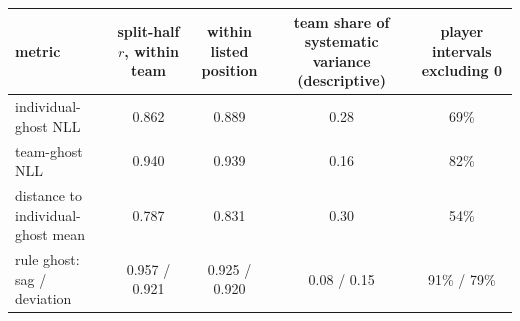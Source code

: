 \begin{tabular}{lcccc}
\hline
metric & split-half $r$, within team & within listed position & team share of systematic variance (descriptive) & player intervals excluding 0 \\
\hline
individual-ghost NLL & 0.862 & 0.889 & 0.28 & 69\% \\
team-ghost NLL & 0.940 & 0.939 & 0.16 & 82\% \\
distance to individual-ghost mean & 0.787 & 0.831 & 0.30 & 54\% \\
rule ghost: sag / deviation & 0.957 / 0.921 & 0.925 / 0.920 & 0.08 / 0.15 & 91\% / 79\% \\
\hline
\end{tabular}
